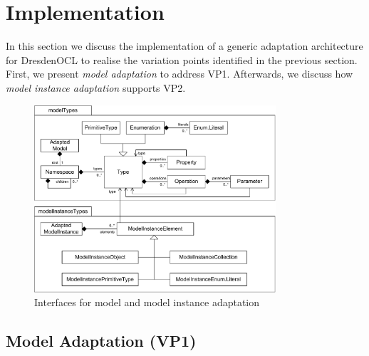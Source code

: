 \section{Implementation}
\label{sec:implementation}
	In this section we discuss the implementation of a generic adaptation
	architecture for DresdenOCL to realise the
	variation points identified in the previous section. First, we present
	\emph{model adaptation} to address VP1. Afterwards, we discuss how \emph{model
	instance adaptation} supports VP2.
	
	\begin{figure}[!t]
			\centering
				\includegraphics[width=0.80\textwidth]{figures/coreconcepts.pdf}
			\caption{
			Interfaces for model and model instance adaptation
			}
			\label{fig:coreconcepts}
		\end{figure}
			
			

\subsection{Model Adaptation (VP1)}

